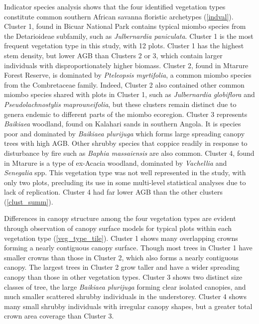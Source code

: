 \documentclass[11pt,a4paper]{article}
\begin{document}
Indicator species analysis shows that the four identified vegetation types constitute common southern African savanna floristic archetypes (\autoref{indval}). Cluster 1, found in Bicuar National Park contains typical miombo species from the Detarioideae subfamily, such as \textit{Julbernardia paniculata}. Cluster 1 is the most frequent vegetation type in this study, with 12 plots. Cluster 1 has the highest stem density, but lower AGB than Clusters 2 or 3, which contain larger individuals with disproportionately higher biomass. Cluster 2, found in Mtarure Forest Reserve, is dominated by \textit{Pteleopsis myrtifolia}, a common miombo species from the Combretaceae family. Indeed, Cluster 2 also contained other common miombo species shared with plots in Cluster 1, such as \textit{Julbernardia globiflora} and \textit{Pseudolachnostylis maprouneifolia}, but these clusters remain distinct due to genera endemic to different parts of the miombo ecoregion. Cluster 3 represents \textit{Baikiaea} woodland, found on Kalahari sands in southern Angola. It is species poor and dominated by \textit{Baikiaea plurijuga} which forms large spreading canopy trees with high AGB. Other shrubby species that coppice readily in response to disturbance by fire such as \textit{Baphia massaiensis} are also common. Cluster 4, found in Mtarure is a type of ex-Acacia woodland, dominated by \textit{Vachellia} and \textit{Senegalia} spp. This vegetation type was not well represented in the study, with only two plots, precluding its use in some multi-level statistical analyses due to lack of replication. Cluster 4 had far lower AGB than the other clusters (\autoref{clust_summ}). 

Differences in canopy structure among the four vegetation types are evident through observation of canopy surface models for typical plots within each vegetation type (\autoref{veg_type_tile}). Cluster 1 shows many overlapping crowns forming a nearly contiguous canopy surface. Though most trees in Cluster 1 have smaller crowns than those in Cluster 2, which also forms a nearly contiguous canopy. The largest trees in Cluster 2 grow taller and have a wider spreading canopy than those in other vegetation types. Cluster 3 shows two distinct size classes of tree, the large \textit{Baikiaea plurijuga} forming clear isolated canopies, and much smaller scattered shrubby individuals in the understorey. Cluster 4 shows many small shrubby individuals with irregular canopy shapes, but a greater total crown area coverage than Cluster 3. 
\end{document}

